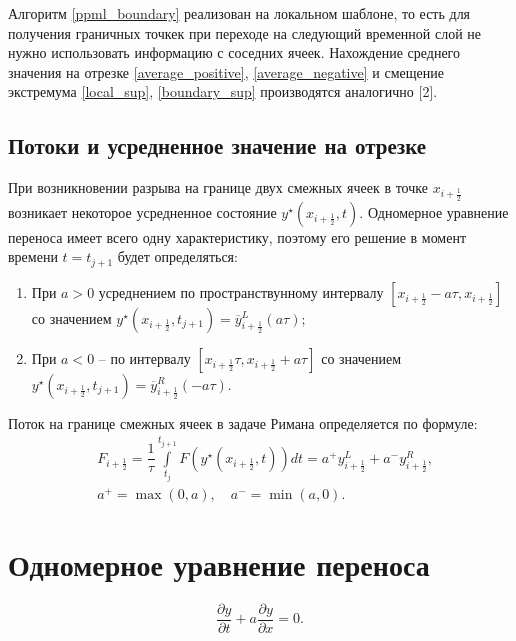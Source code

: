 \documentclass[12pt,a4paper]{article}
\newcommand{\half}{\frac{1}{2}}
\begin{document}
    Алгоритм \eqref{ppml_boundary} реализован на локальном шаблоне, то есть для получения граничных точкек при переходе на следующий временной слой не нужно использовать информацию с соседних ячеек. Нахождение среднего значения на отрезке \eqref{average_positive}, \eqref{average_negative} и смещение экстремума \eqref{local_sup}, \eqref{boundary_sup} производятся аналогично [2].


    \subsection{Потоки и усредненное значение на отрезке}

    При возникновении разрыва на границе двух смежных ячеек в точке $ x_{i+\half} $ возникает некоторое усредненное состояние $ y^\star(x_{i+\half}, t) $. Одномерное уравнение переноса имеет всего одну характеристику, поэтому его решение в момент времени $ t = t_{j+1} $ будет определяться:
    \begin{enumerate}
        \item При $ a > 0 $ усреднением по пространствунному интервалу $ [x_{i+\half}-a \tau, x_{i+\half}] $ со значением $ y^\star(x_{i+\half}, t_{j+1}) = \overline y_{i+\half}^L(a \tau) $;
        
        \item При $ a < 0 $ -- по интервалу $ [x_{i+\half} \tau, x_{i+\half}+a \tau] $ со значением $ y^\star(x_{i+\half}, t_{j+1}) = \overline y_{i+\half}^R(-a \tau) $.
    \end{enumerate}

    Поток на границе смежных ячеек в задаче Римана определяется по формуле:
    \begin{equation}
        \label{boundary_flow}
        \begin{split}
            &F_{i+\half} = \dfrac{1}{\tau} \displaystyle \int\limits_{t_j}^{t_{j+1}} F(y^\star(x_{i+\half}, t))dt = a^+ y_{i+\half}^L + a^- y_{i+\half}^R, \\[0.5em]
            &a^+ = \max(0, a), \quad a^- = \min(a, 0).
        \end{split}
    \end{equation}

    \section{ Одномерное уравнение переноса }

    \begin{equation}
        \label{convection-diffusion}
      \dfrac{\partial y}{\partial t} + a \dfrac{\partial y}{\partial x} = 0.  
    \end{equation}
\end{document}
